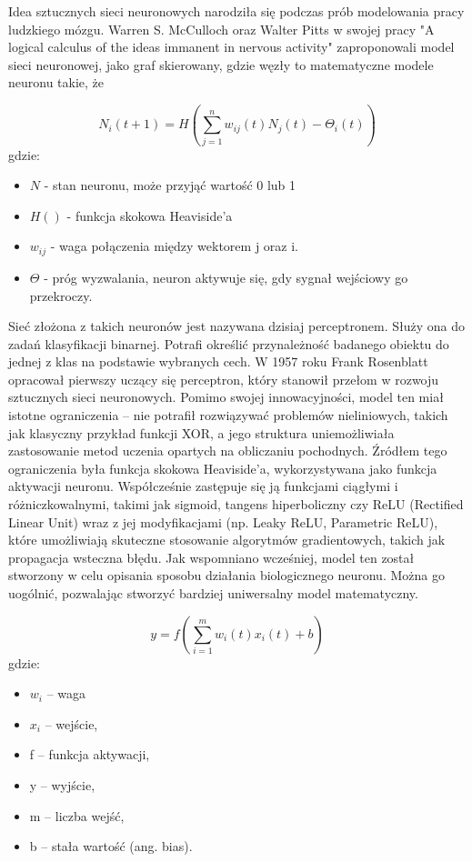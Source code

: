 Idea sztucznych sieci neuronowych narodziła się podczas prób modelowania pracy ludzkiego mózgu. Warren S. McCulloch oraz Walter Pitts w swojej pracy "A logical calculus of the ideas immanent in nervous activity" \cite{McCulloch1943} zaproponowali model sieci neuronowej, jako graf skierowany, gdzie węzły to matematyczne modele neuronu takie, że

\[N_{i}\left( t+1 \right) = H\left( \sum_{j=1}^{n}w_{ij}(t)N_{j}(t)-\Theta_{i}\left( t \right)\right)\]
gdzie:
\begin{itemize}
	\item $N$ - stan neuronu, może przyjąć wartość 0 lub 1
	\item $H()$ - funkcja skokowa Heaviside'a
	\item $w_{ij}$ - waga połączenia między wektorem j oraz i.
	\item $\Theta$ - próg wyzwalania, neuron aktywuje się, gdy sygnał wejściowy go przekroczy.
\end{itemize}
\medskip



Sieć złożona z takich neuronów jest nazywana dzisiaj perceptronem. Służy ona do zadań klasyfikacji binarnej. Potrafi określić przynależność badanego obiektu do jednej z klas na podstawie wybranych cech. W 1957 roku Frank Rosenblatt opracował pierwszy uczący się perceptron, który stanowił przełom w rozwoju sztucznych sieci neuronowych. Pomimo swojej innowacyjności, model ten miał istotne ograniczenia – nie potrafił rozwiązywać problemów nieliniowych, takich jak klasyczny przykład funkcji XOR, a jego struktura uniemożliwiała zastosowanie metod uczenia opartych na obliczaniu pochodnych.
Źródłem tego ograniczenia była funkcja skokowa Heaviside’a, wykorzystywana jako funkcja aktywacji neuronu. Współcześnie zastępuje się ją funkcjami ciągłymi i różniczkowalnymi, takimi jak sigmoid, tangens hiperboliczny czy ReLU (Rectified Linear Unit) wraz z jej modyfikacjami (np. Leaky ReLU, Parametric ReLU), które umożliwiają skuteczne stosowanie algorytmów gradientowych, takich jak propagacja wsteczna błędu.
\cite{minsky1969perceptrons}
Jak wspomniano wcześniej, model ten został stworzony w celu opisania sposobu działania biologicznego neuronu. Można go uogólnić, pozwalając stworzyć bardziej uniwersalny model matematyczny.

\[ y=f\left( \sum_{i=1}^{m}w_{i}(t)x_{i}(t)+b\right) \]
gdzie:
\begin{itemize}
	\item $w_{i}$ – waga
	\item $x_{i}$ – wejście, 
	\item f – funkcja aktywacji, 
	\item y – wyjście, 
	\item m – liczba wejść,
	\item b – stała wartość (ang. bias).
\end{itemize}

